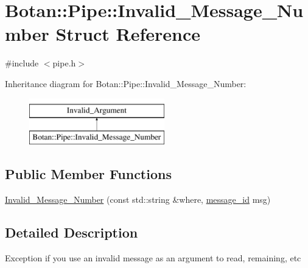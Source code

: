 \hypertarget{structBotan_1_1Pipe_1_1Invalid__Message__Number}{\section{Botan\-:\-:Pipe\-:\-:Invalid\-\_\-\-Message\-\_\-\-Number Struct Reference}
\label{structBotan_1_1Pipe_1_1Invalid__Message__Number}
}


{\ttfamily \#include $<$pipe.\-h$>$}

Inheritance diagram for Botan\-:\-:Pipe\-:\-:Invalid\-\_\-\-Message\-\_\-\-Number\-:\begin{figure}[H]
\begin{center}
\leavevmode
\includegraphics[height=2.000000cm]{structBotan_1_1Pipe_1_1Invalid__Message__Number}
\end{center}
\end{figure}
\subsection*{Public Member Functions}
\begin{DoxyCompactItemize}
\item 
\hyperlink{structBotan_1_1Pipe_1_1Invalid__Message__Number_a71432a17859d38c32800be31b3916f68}{Invalid\-\_\-\-Message\-\_\-\-Number} (const std\-::string \&where, \hyperlink{classBotan_1_1Pipe_a122c19120c1c21f270b6b6225ca9883c}{message\-\_\-id} msg)
\end{DoxyCompactItemize}


\subsection{Detailed Description}
Exception if you use an invalid message as an argument to read, remaining, etc 

